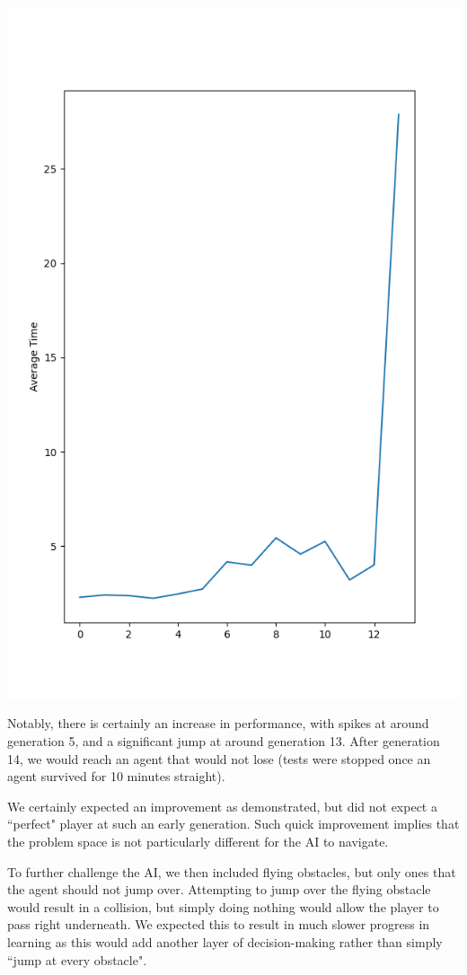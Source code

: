 \documentclass[12pt]{article}
\begin{document}
\begin{flushleft}
\includegraphics[scale=.4]{Figure_2.png}

Notably, there is certainly an increase in performance, with spikes at around generation 5, and a significant jump at around generation 13. After generation 14, we would reach an agent that would not lose (tests were stopped once an agent survived for 10 minutes straight).

We certainly expected an improvement as demonstrated, but did not expect a ``perfect" player at such an early generation. Such quick improvement implies that the problem space is not particularly different for the AI to navigate.

\hfill

To further challenge the AI, we then included flying obstacles, but only ones that the agent should not jump over. Attempting to jump over the flying obstacle would result in a collision, but simply doing nothing would allow the player to pass right underneath. We expected this to result in much slower progress in learning as this would add another layer of decision-making rather than simply ``jump at every obstacle".


\end{flushleft}
\end{document}
